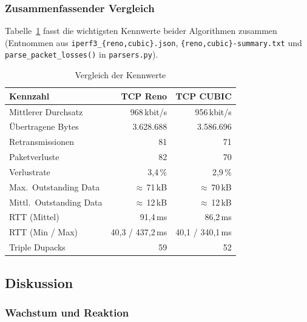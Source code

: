 \subsubsection{Zusammenfassender Vergleich}

Tabelle~\ref{tab:reno_cubic_summary} fasst die wichtigsten Kennwerte beider Algorithmen zusammen (Entnommen aus \texttt{iperf3\_\allowbreak{}\{reno,\allowbreak{}cubic\}.\allowbreak{}json}, \texttt{\{reno,\allowbreak{}cubic\}-\allowbreak{}summary.\allowbreak{}txt} und \texttt{parse\_\allowbreak{}packet\_\allowbreak{}losses()} in \texttt{parsers.py}).

\begin{table}[h]
    \centering
    \begin{tabular}{|l|r|r|}
        \hline
        \textbf{Kennzahl} & \textbf{TCP Reno} & \textbf{TCP CUBIC} \\ \hline
        Mittlerer Durchsatz & 968\,kbit/s & 956\,kbit/s \\ \hline
        Übertragene Bytes & 3.628.688 & 3.586.696 \\ \hline
        Retransmissionen & 81 & 71 \\ \hline
        Paketverluste & 82 & 70 \\ \hline
        Verlustrate & 3,4\,\% & 2,9\,\% \\ \hline
        Max.\ Outstanding Data & $\approx$\,71\,kB & $\approx$\,70\,kB \\ \hline
        Mittl.\ Outstanding Data & $\approx$\,12\,kB & $\approx$\,12\,kB \\ \hline
        RTT (Mittel) & 91,4\,ms & 86,2\,ms \\ \hline
        RTT (Min / Max) & 40,3 / 437,2\,ms & 40,1 / 340,1\,ms \\ \hline
        Triple Dupacks & 59 & 52 \\ \hline
    \end{tabular}
    \caption{Vergleich der Kennwerte}\label{tab:reno_cubic_summary}
\end{table}

\FloatBarrier{}
\subsection{Diskussion}\label{sec:reno-cubic-diskussion}

\subsubsection{Wachstum und Reaktion}

